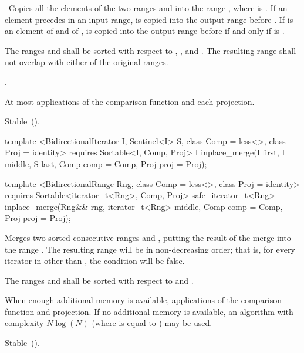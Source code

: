 \begin{itemdescr}
\pnum
\effects\ Copies all the elements of the two ranges  and
 into the range , where 
is .
If an element  precedes  in an input range,
 is copied into the output range before . If  is
an element of  and  of ,
 is copied into the output range before  if and only if
 is
.

\pnum
\requires The ranges  and  shall be
sorted with respect to , , and .
The resulting range shall not overlap with either of the original ranges.

\pnum
\returns
{}.

\pnum
\complexity
At most
applications of the comparison function and each projection.

\pnum
\remarks Stable~().
\end{itemdescr}

%
\begin{itemdecl}
template <BidirectionalIterator I, Sentinel<I> S, class Comp = less<>,
    class Proj = identity>
  requires Sortable<I, Comp, Proj>
  I
    inplace_merge(I first, I middle, S last, Comp comp = Comp{}, Proj proj = Proj{});

template <BidirectionalRange Rng, class Comp = less<>, class Proj = identity>
  requires Sortable<iterator_t<Rng>, Comp, Proj>
  safe_iterator_t<Rng>
    inplace_merge(Rng&& rng, iterator_t<Rng> middle, Comp comp = Comp{},
                  Proj proj = Proj{});
\end{itemdecl}

\begin{itemdescr}
\pnum
\effects
Merges two sorted consecutive ranges
and
,
putting the result of the merge into the range
.
The resulting range will be in non-decreasing order;
that is, for every iterator
in
other than
,
the condition
will be false.

\pnum
\requires
The ranges  and  shall be
sorted with respect to  and .

\pnum
\returns {}

\pnum
\complexity
When enough additional memory is available,
applications of the comparison function and projection.
If no additional memory is available, an algorithm with complexity
$N \log(N)$
(where
is equal to
)
may be used.

\pnum
\remarks Stable~().
\end{itemdescr}

